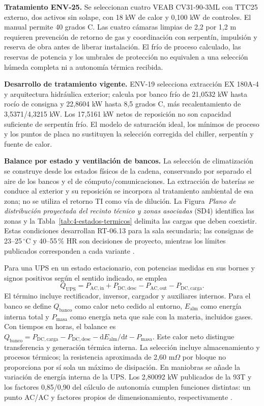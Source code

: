 \textbf{Tratamiento ENV-25.} Se seleccionan cuatro VEAB CV31-90-3ML con TTC25 externo, dos activos sin solape, con 18 kW de calor y 0,100 kW de controles. El manual permite 40 grados C. Las cuatro cámaras limpias de 2,2 por 1,2 m requieren prevención de retorno de gas y coordinación con serpentín, impulsión y reserva de obra antes de liberar instalación. El frío de proceso calculado, las reservas de potencia y los umbrales de protección no equivalen a una selección húmeda completa ni a autonomía térmica recibida.

\textbf{Desarrollo de tratamiento vigente.} ENV-19 selecciona extracción EX 180A-4 y arquitectura hidráulica exterior; calcula por banco frío de 21,0532 kW hasta rocío de consigna y 22,8604 kW hasta 8,5 grados C, más recalentamiento de 3,5371/4,3215 kW. Los 17,5161 kW netos de reposición no son capacidad suficiente de serpentín frío. El modelo de saturación ideal, los mínimos de proceso y los puntos de placa no sustituyen la selección corregida del chiller, serpentín y fuente de calor. 

\textbf{Balance por estado y ventilación de bancos.} La selección de climatización se construye desde los estados físicos de la cadena, conservando por separado el aire de los bancos y el de cómputo/comunicaciones. La extracción de baterías se conduce al exterior y su reposición se incorpora al tratamiento ambiental de esa zona; no se utiliza el retorno TI como vía de dilución. La Figura~\emph{Plano de distribución proyectada del recinto técnico y zonas asociadas} (SD4) identifica las zonas y la Tabla~\ref{tab:4-estados-termicos} delimita las cargas que deben coexistir. Estas condiciones desarrollan RT-06.13 para la sala secundaria; las consignas de 23--25\,$^{\circ}$C y 40--55\,\% HR son decisiones de proyecto, mientras los límites publicados corresponden a cada variante \parencites[secc.~6.1; RT-06.13, pp.~14--15]{pucv-transversal}{csbManualJunio2025}.

Para una UPS en un estado estacionario, con potencias medidas en sus bornes y signos positivos según el sentido indicado, se emplea
\[
Q_{\mathrm{UPS}}=P_{\mathrm{AC,in}}+P_{\mathrm{DC,desc}}
                -P_{\mathrm{AC,out}}-P_{\mathrm{DC,carga}}.
\]
El término incluye rectificador, inversor, cargador y auxiliares internos. Para el banco se define $Q_{\mathrm{banco}}$ como calor neto cedido al entorno, $E_{\mathrm{alm}}$ como energía interna total y $P_{\mathrm{masa}}$ como energía neta que sale con la materia, incluidos gases. Con tiempos en horas, el balance es $Q_{\mathrm{banco}}=P_{\mathrm{DC,carga}}-P_{\mathrm{DC,desc}}-\mathrm{d}E_{\mathrm{alm}}/\mathrm{d}t-P_{\mathrm{masa}}$. Este calor neto distingue transferencia y generación térmica interna. La selección incluye almacenamiento y procesos térmicos; la resistencia aproximada de 2,60 m$\Omega$ por bloque no proporciona por sí sola un máximo de disipación. En maniobras se añade la variación de energía interna de la UPS. Los 2,80092 kW publicados de la 93T y los factores 0,85/0,90 del cálculo de autonomía cumplen funciones distintas: un punto AC/AC y factores propios de dimensionamiento, respectivamente \parencites{p7-eaton-93t-tecnica}{csbHRL12540WRA260131}.

